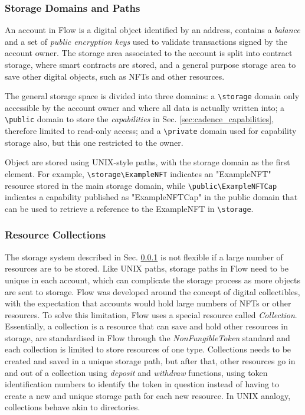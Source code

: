 \documentclass[../NFTComp_IEEE.tex]{subfiles}
\begin{document}
\subsubsection{Storage Domains and Paths}
\label{sec:cadence_storage_domain}
An account in Flow is a digital object identified by an address, contains a \textit{balance} and a set of \textit{public encryption keys} used to validate transactions signed by the account owner. The storage area associated to the account is split into contract storage, where smart contracts are stored, and a general purpose storage area to save other digital objects, such as NFTs and other resources.
\par
The general storage space is divided into three domains: a \verb |\storage| domain only accessible by the account owner and where all data is actually written into; a \verb |\public| domain to store the \textit{capabilities} in Sec. \ref{sec:cadence_capabilities}, therefore limited to read-only access; and a \verb |\private| domain used for capability storage also, but this one restricted to the owner.
\par
Object are stored using UNIX-style paths, with the storage domain as the first element. For example, \verb |\storage\ExampleNFT| indicates an "ExampleNFT" resource stored in the main storage domain, while \verb |\public\ExampleNFTCap| indicates a capability published as "ExampleNFTCap" in the public domain that can be used to retrieve a reference to the ExampleNFT in \verb|\storage|.

\subsubsection{Resource Collections}
\label{sec:resource_collections}
The storage system described in Sec. \ref{sec:cadence_storage_domain} is not flexible if a large number of resources are to be stored. Like UNIX paths, storage paths in Flow need to be unique in each account, which can complicate the storage process as more objects are sent to storage. Flow was developed around the concept of digital collectibles, with the expectation that accounts would hold large numbers of NFTs or other resources. To solve this limitation, Flow uses a special resource called \textit{Collection}. Essentially, a collection is a resource that can save and hold other resources in storage, are standardised in Flow through the \textit{NonFungibleToken} standard and each collection is limited to store resources of one type. Collections needs to be created and saved in a unique storage path, but after that, other resources go in and out of a collection using \textit{deposit} and \textit{withdraw} functions, using token identification numbers to identify the token in question instead of having to create a new and unique storage path for each new resource. In UNIX analogy, collections behave akin to directories.
\end{document}
